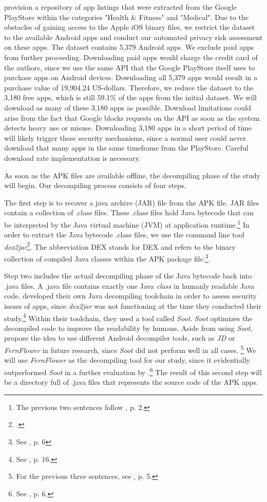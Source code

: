 \documentclass[
	a4paper,
	oneside,
	12pt,
	liststotocnumbered
]{article}
\let\cite\textcite
\begin{document}
\cite{Xu2015} provision a repository of app listings that were extracted from the Google PlayStore within the categories "Health \& Fitness" and "Medical".
Due to the obstacles of gaining access to the Apple iOS binary files, we restrict the dataset to the available Android apps and conduct our automated privacy risk assessment on these apps.
The \cite{Xu2015} dataset contains 5,379 Android apps. 
We exclude paid apps from further proceeding. Downloading paid apps would charge the credit card of the authors, since we use the same \acs{API} that the Google PlayStore itself uses to purchase apps on Android devices. 
Downloading all 5,379 apps would result in a purchase value of 19,904.24 US-dollars. 
Therefore, we reduce the dataset to the 3,180 free apps, which is still 59.1\% of the apps from the initial dataset. 
We will download as many of these 3,180 apps as possible.
Download limitations could arise from the fact that Google blocks requests on the API as soon as the system detects heavy use or misuse. 
Downloading 3,180 apps in a short period of time will likely trigger these security mechanisms, since a normal user could never download that many apps in the same timeframe from the PlayStore.
Careful download rate implementation is necessary.

As soon as the \acs{APK} files are available offline, the decompiling phase of the study will begin.
Our decompiling process consists of four steps.

The first step is to recover a java archive (\acs{JAR}) file from the \acs{APK} file.
\acs{JAR} files contain a collection of .class files. 
These .class files hold Java bytecode that can be interpreted by the Java virtual machine (\acs{JVM}) at application runtime.\footnote{The previous two sentences follow \cite{Enck2011}, p. 2.} 
In order to extract the Java bytecode .class files, we use the command line tool \textit{dex2jar}\footnote{\cite{Pan2010}.}. 
The abbreviation \acs{DEX} stands for \acl{DEX} and refers to the binary collection of compiled Java classes within the \acs{APK} package file.\footnote{See \cite{xu2013}, p. 6}.

Step two includes the actual decompiling phase of the Java bytecode back into .java files. 
A .java file contains exactly one Java \textit{class} in humanly readable Java code. 
\cite{Enck2011} developed their own Java decompiling toolchain in order to assess security issues of \mH apps, since \textit{dex2jar} was not functioning at the time they conducted their study.\footnote{See \cite{Enck2011}, p. 16.}
Within their toolchain, they used a tool called \textit{Soot}.
\textit{Soot} optimizes the decompiled code to improve the readability by humans.
Aside from using \textit{Soot}, \cite{Enck2011} propose the idea to use different Android decompiler tools, such as \textit{JD} or \textit{FernFlower} in future research, since \textit{Soot} did not perform well in all cases. \footnote{For the previous three sentences, see \cite{Enck2011}, p. 5.}
We will use \textit{FernFlower} as the decompiling tool for our study, since it evidentially outperformed \textit{Soot} in a further evaluation by \cite{Enck2011}.\footnote{See \cite{Enck2011}, p. 6.}
The result of this second step will be a directory full of .java files that represents the source code of the \acs{APK} apps.
\end{document}
